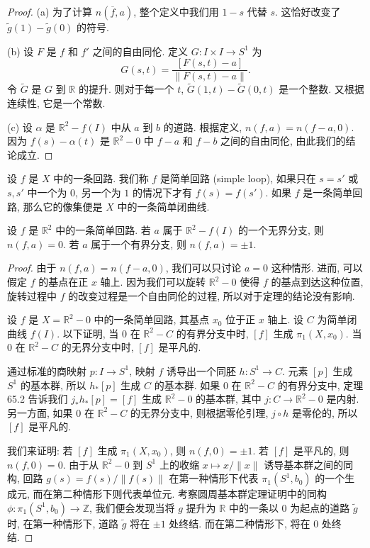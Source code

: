 \begin{proof}
(a) 为了计算 $n(\overline{f},a)$, 整个定义中我们用 $1-s$ 代替 $s$. 这恰好改变了 $\widetilde{g}(1)-\widetilde{g}(0)$ 的符号.

(b) 设 $F$ 是 $f$ 和 $f'$ 之间的自由同伦. 定义 $G\colon I\times I\to S^{1}$ 为
\[
G(s,t)=\frac{[F(s,t)-a]}{\|F(s,t)-a\|}.
\]
令 $\widetilde{G}$ 是 $G$ 到 $\mathbb{R}$ 的提升. 则对于每一个 $t$, $\widetilde{G}(1,t)-\widetilde{G}(0,t)$ 是一个整数. 又根据连续性, 它是一个常数.

(c) 设 $\alpha$ 是 $\mathbb{R}^{2}-f(I)$ 中从 $a$ 到 $b$ 的道路. 根据定义, $n(f,a)=n(f-a,0)$. 因为 $f(s)-\alpha(t)$ 是 $\mathbb{R}^{2}-0$ 中 $f-a$ 和 $f-b$ 之间的自由同伦, 由此我们的结论成立.
\end{proof}

\begin{definition}\label{ch10:def-simple-loop}
设 $f$ 是 $X$ 中的一条回路. 我们称 $f$ 是简单回路 (simple loop), 如果只在 $s=s'$ 或 $s,s'$ 中一个为 $0$, 另一个为 $1$ 的情况下才有 $f(s)=f(s')$. 如果 $f$ 是一条简单回路, 那么它的像集便是 $X$ 中的一条简单闭曲线.
\end{definition}

\begin{theorem}\label{ch10:thm-winding-simple}
设 $f$ 是 $\mathbb{R}^{2}$ 中的一条简单回路. 若 $a$ 属于 $\mathbb{R}^{2}-f(I)$ 的一个无界分支, 则 $n(f,a)=0$. 若 $a$ 属于一个有界分支, 则 $n(f,a)=\pm 1$.
\end{theorem}

\begin{proof}
由于 $n(f,a)=n(f-a,0)$, 我们可以只讨论 $a=0$ 这种情形. 进而, 可以假定 $f$ 的基点在正 $x$ 轴上. 因为我们可以旋转 $\mathbb{R}^{2}-0$ 使得 $f$ 的基点到达这种位置, 旋转过程中 $f$ 的改变过程是一个自由同伦的过程, 所以对于定理的结论没有影响.

设 $f$ 是 $X=\mathbb{R}^{2}-0$ 中的一条简单回路, 其基点 $x_{0}$ 位于正 $x$ 轴上. 设 $C$ 为简单闭曲线 $f(I)$. 以下证明, 当 $0$ 在 $\mathbb{R}^{2}-C$ 的有界分支中时, $[f]$ 生成 $\pi_{1}(X,x_{0})$. 当 $0$ 在 $\mathbb{R}^{2}-C$ 的无界分支中时, $[f]$ 是平凡的.

通过标准的商映射 $p\colon I\to S^{1}$, 映射 $f$ 诱导出一个同胚 $h\colon S^{1}\to C$. 元素 $[p]$ 生成 $S^{1}$ 的基本群, 所以 $h_{*}[p]$ 生成 $C$ 的基本群. 如果 $0$ 在 $\mathbb{R}^{2}-C$ 的有界分支中, 定理 65.2 告诉我们 $j_{*}h_{*}[p]=[f]$ 生成 $\mathbb{R}^{2}-0$ 的基本群, 其中 $j\colon C\to\mathbb{R}^{2}-0$ 是内射. 另一方面, 如果 $0$ 在 $\mathbb{R}^{2}-C$ 的无界分支中, 则根据零伦引理, $j\circ h$ 是零伦的, 所以 $[f]$ 是平凡的.

我们来证明: 若 $[f]$ 生成 $\pi_{1}(X,x_{0})$, 则 $n(f,0)=\pm 1$. 若 $[f]$ 是平凡的, 则 $n(f,0)=0$. 由于从 $\mathbb{R}^{2}-0$ 到 $S^{1}$ 上的收缩 $x\mapsto x/\|x\|$ 诱导基本群之间的同构, 回路 $g(s)=f(s)/\|f(s)\|$ 在第一种情形下代表 $\pi_{1}(S^{1},b_{0})$ 的一个生成元, 而在第二种情形下则代表单位元. 考察圆周基本群定理证明中的同构 $\phi\colon\pi_{1}(S^{1},b_{0})\to\mathbb{Z}$, 我们便会发现当将 $g$ 提升为 $\mathbb{R}$ 中的一条以 $0$ 为起点的道路 $\widetilde{g}$ 时, 在第一种情形下, 道路 $\widetilde{g}$ 将在 $\pm 1$ 处终结. 而在第二种情形下, 将在 $0$ 处终结.
\end{proof}

